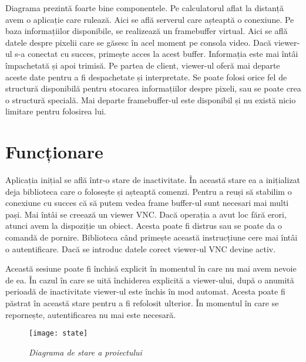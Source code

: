 Diagrama prezintă foarte bine componentele. Pe calculatorul aflat la distanță avem o aplicație care rulează. Aici se află serverul care așteaptă o conexiune. Pe baza informațiilor disponibile, se realizează un framebuffer virtual. Aici se află datele despre pixelii care se găsesc în acel moment pe consola video. Dacă viewer-ul s-a conectat cu succes, primește acces la acest buffer. Informația este mai întâi împachetată și apoi trimisă. Pe partea de client, viewer-ul oferă mai departe aceste date pentru a fi despachetate și interpretate. Se poate folosi orice fel de structură disponibilă pentru stocarea informațiilor despre pixeli, sau se poate crea o structură specială. Mai departe framebuffer-ul este disponibil și nu există nicio limitare pentru folosirea lui.







\section{Funcționare}


Aplicația inițial se află într-o stare de inactivitate. În această stare ea a inițializat deja biblioteca care o folosește și așteaptă comenzi. Pentru a reuși să stabilim o conexiune cu succes că să putem vedea frame buffer-ul sunt necesari mai multi pași. Mai întâi se creează un viewer VNC. Dacă operația a avut loc fără erori, atunci avem la dispoziție un obiect. Acesta poate fi distrus sau se poate da o comandă de pornire. Biblioteca când primește această instrucțiune cere mai întâi o autentificare. Dacă se introduc datele corect viewer-ul VNC devine activ. 

Această sesiune poate fi închisă explicit în momentul în care nu mai avem nevoie de ea. În cazul în care se uită închiderea explicită a viewer-ului, după o anumită perioadă de inactivitate viewer-ul este închis în mod automat. Acesta poate fi păstrat în această stare pentru a fi refolosit ulterior. În momentul în care se repornește, autentificarea nu mai este necesară.

\begin{figure}
    \centering
    \texttt{[image: state]}
    \caption{\textit{Diagrama de stare a proiectului}}
    \label{d:state}
\end{figure}



